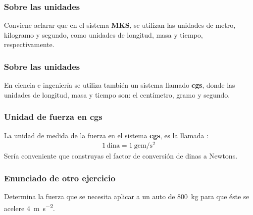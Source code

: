 \documentclass[14pt]{beamer}
\begin{document}
\begin{frame}
\frametitle{Sobre las unidades}
Conviene aclarar que en el sistema \textbf{MKS}, \pause se utilizan las unidades de metro, kilogramo y segundo, como unidades de longitud, masa y tiempo, respectivamente.
\end{frame}
\begin{frame}
\frametitle{Sobre las unidades}
En ciencia e ingeniería se utiliza también un sistema llamado \textbf{cgs}, \pause donde las unidades de longitud, masa y tiempo son: el centímetro, gramo y segundo.
\end{frame}
\begin{frame}
\frametitle{Unidad de fuerza en cgs}
La unidad de medida de la fuerza en el sistema \textbf{cgs}, es la llamada :
\pause
\begin{align*}
1 \, \text{dina} = \SI[per-mode=fraction]{1}{\gram\centi\meter\per\square\second}
\end{align*}
Sería conveniente que construyas el factor de conversión de dinas a Newtons.
\end{frame}
\begin{frame}
\frametitle{Enunciado de otro ejercicio}
Determina la fuerza que se necesita aplicar a un auto de \SI{800}{\kilo\gram} para que éste se acelere \SI{4}{\meter\per\square\second}.
\end{frame}
\end{document}
